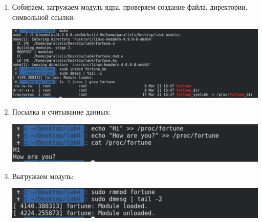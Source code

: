 \documentclass[a4paper,14pt]{extreport} %
\begin{document}
\begin{enumerate}
\item Собираем, загружаем модуль ядра, проверяем создание файла, директории, символьной ссылки:

\includegraphics[scale=0.45]{images/insmod}

\item Посылка и считывание данных:

\includegraphics[scale=0.45]{images/cat}

\item Выгружаем модуль:

\includegraphics[scale=0.45]{images/rmmod}

\end{enumerate}
\end{document}
